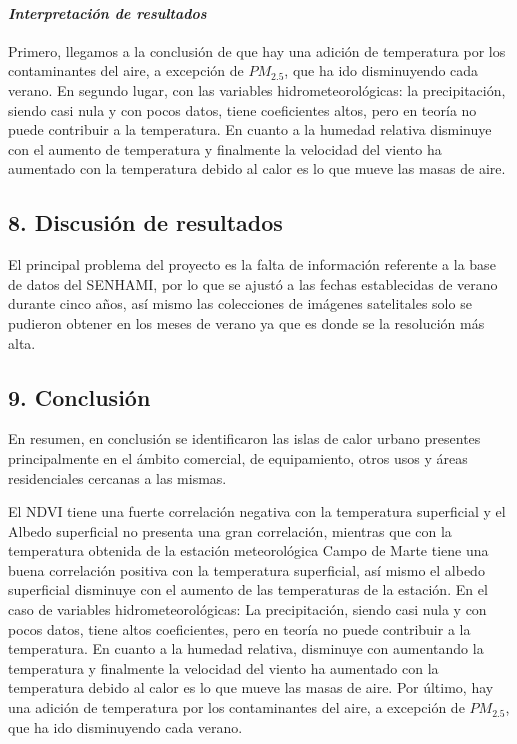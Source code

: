 \documentclass[
]{article}
\begin{document}
\hypertarget{interpretaciuxf3n-de-resultados}{%
\paragraph{\texorpdfstring{\emph{Interpretación de
resultados}}{Interpretación de resultados}}\label{interpretaciuxf3n-de-resultados}}

Primero, llegamos a la conclusión de que hay una adición de temperatura
por los contaminantes del aire, a excepción de \(PM_{2.5}\), que ha ido
disminuyendo cada verano. En segundo lugar, con las variables
hidrometeorológicas: la precipitación, siendo casi nula y con pocos
datos, tiene coeficientes altos, pero en teoría no puede contribuir a la
temperatura. En cuanto a la humedad relativa disminuye con el aumento de
temperatura y finalmente la velocidad del viento ha aumentado con la
temperatura debido al calor es lo que mueve las masas de aire.

\hypertarget{discusiuxf3n-de-resultados}{%
\subsection{8. Discusión de
resultados}\label{discusiuxf3n-de-resultados}}

El principal problema del proyecto es la falta de información referente
a la base de datos del SENHAMI, por lo que se ajustó a las fechas
establecidas de verano durante cinco años, así mismo las colecciones de
imágenes satelitales solo se pudieron obtener en los meses de verano ya
que es donde se la resolución más alta.

\hypertarget{conclusiuxf3n}{%
\subsection{9. Conclusión}\label{conclusiuxf3n}}

En resumen, en conclusión se identificaron las islas de calor urbano
presentes principalmente en el ámbito comercial, de equipamiento, otros
usos y áreas residenciales cercanas a las mismas.

El NDVI tiene una fuerte correlación negativa con la temperatura
superficial y el Albedo superficial no presenta una gran correlación,
mientras que con la temperatura obtenida de la estación meteorológica
Campo de Marte tiene una buena correlación positiva con la temperatura
superficial, así mismo el albedo superficial disminuye con el aumento de
las temperaturas de la estación. En el caso de variables
hidrometeorológicas: La precipitación, siendo casi nula y con pocos
datos, tiene altos coeficientes, pero en teoría no puede contribuir a la
temperatura. En cuanto a la humedad relativa, disminuye con aumentando
la temperatura y finalmente la velocidad del viento ha aumentado con la
temperatura debido al calor es lo que mueve las masas de aire. Por
último, hay una adición de temperatura por los contaminantes del aire, a
excepción de \(PM_{2.5}\), que ha ido disminuyendo cada verano.
\end{document}
